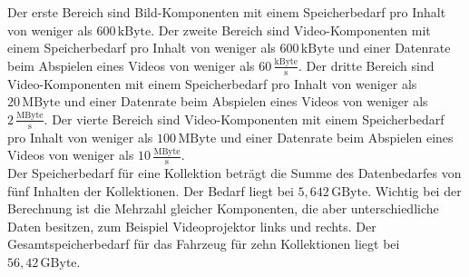 Der erste Bereich sind Bild-Komponenten mit einem Speicherbedarf pro Inhalt von weniger als $ 600\,\mathrm{kByte} $. Der zweite Bereich sind Video-Komponenten mit einem Speicherbedarf pro Inhalt von weniger als $ 600\,\mathrm{kByte} $ und einer Datenrate beim Abspielen eines Videos von weniger als $ 60\,\frac{\mathrm{kByte}}{\mathrm{s}} $. Der dritte Bereich sind Video-Komponenten mit einem Speicherbedarf pro Inhalt von weniger als $ 20\,\mathrm{MByte} $ und einer Datenrate beim Abspielen eines Videos von weniger als $ 2\,\frac{\mathrm{MByte}}{\mathrm{s}} $. Der vierte Bereich sind Video-Komponenten mit einem Speicherbedarf pro Inhalt von weniger als $ 100\,\mathrm{MByte} $ und einer Datenrate beim Abspielen eines Videos von weniger als $ 10\,\frac{\mathrm{MByte}}{\mathrm{s}} $. \\
Der Speicherbedarf für eine Kollektion beträgt die Summe des Datenbedarfes von fünf Inhalten der Kollektionen. Der Bedarf liegt bei $ 5,642\,\mathrm{GByte} $. Wichtig bei der Berechnung ist die Mehrzahl gleicher Komponenten, die aber unterschiedliche Daten besitzen, zum Beispiel Videoprojektor links und rechts. Der Gesamtspeicherbedarf für das Fahrzeug für zehn Kollektionen liegt bei $ 56,42\,\mathrm{GByte} $.
